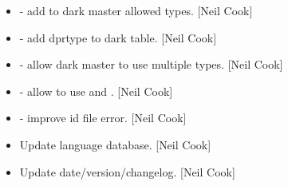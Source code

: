 \documentclass[a4paper,10pt,english]{report}
\begin{document}
\begin{itemize}
\item {} 
 - add  to
dark master allowed types. {[}Neil Cook{]}

\item {} 
 - add dprtype to dark table. {[}Neil Cook{]}

\item {} 
 - allow dark master to use
multiple  types. {[}Neil Cook{]}

\item {} 
 - allow  to
use  and . {[}Neil Cook{]}

\item {} 
 - improve id file error. {[}Neil Cook{]}

\item {} 
Update language database. {[}Neil Cook{]}

\item {} 
Update date/version/changelog. {[}Neil Cook{]}

\end{itemize}
\end{document}

